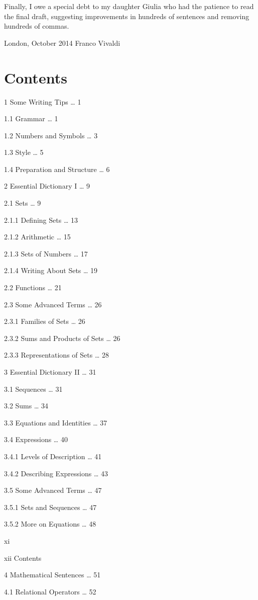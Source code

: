 \documentclass[11pt]{article}
\theoremstyle{plain}
\theoremstyle{definition}
\begin{document}
Finally, I owe a special debt to my daughter Giulia who had the patience to read the final draft, suggesting improvements in hundreds of sentences and removing hundreds of commas.

London, October 2014 Franco Vivaldi

\section{Contents}

1 Some Writing Tips \dots{} 1

1.1 Grammar \dots{} 1

1.2 Numbers and Symbols \dots{} 3

1.3 Style \dots{} 5

1.4 Preparation and Structure \dots{} 6

2 Essential Dictionary I \dots{} 9

2.1 Sets \dots{} 9

2.1.1 Defining Sets \dots{} 13

2.1.2 Arithmetic \dots{} 15

2.1.3 Sets of Numbers \dots{} 17

2.1.4 Writing About Sets \dots{} 19

2.2 Functions \dots{} 21

2.3 Some Advanced Terms \dots{} 26

2.3.1 Families of Sets \dots{} 26

2.3.2 Sums and Products of Sets \dots{} 26

2.3.3 Representations of Sets \dots{} 28

3 Essential Dictionary II \dots{} 31

3.1 Sequences \dots{} 31

3.2 Sums \dots{} 34

3.3 Equations and Identities \dots{} 37

3.4 Expressions \dots{} 40

3.4.1 Levels of Description \dots{} 41

3.4.2 Describing Expressions \dots{} 43

3.5 Some Advanced Terms \dots{} 47

3.5.1 Sets and Sequences \dots{} 47

3.5.2 More on Equations \dots{} 48

xi

xii Contents

4 Mathematical Sentences \dots{} 51

4.1 Relational Operators \dots{} 52
\end{document}
